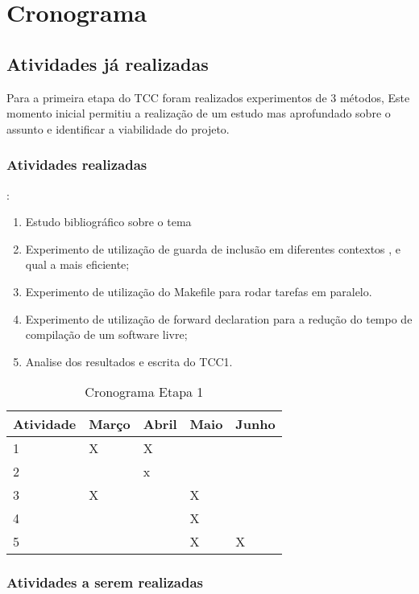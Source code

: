 \chapter[Cronograma]{Cronograma}

\section{Atividades já realizadas}

Para a primeira etapa do TCC foram realizados experimentos de 3 métodos,
 Este momento inicial permitiu a realização de um estudo mas aprofundado
 sobre o assunto e identificar a viabilidade do projeto.


\subsection{Atividades realizadas}:

\begin{enumerate}
	\item		Estudo bibliográfico sobre o tema
	\item		Experimento de utilização de guarda de inclusão em diferentes contextos , e qual a mais eficiente;
	\item		Experimento de utilização do Makefile para rodar tarefas em paralelo.
	\item		Experimento de utilização de forward declaration para a redução do tempo de compilação de um software livre;
	\item		Analise dos resultados e escrita do TCC1.
\end{enumerate}

\begin{table}[h]
\centering
\begin{tabular}{|l|l|l|l|l|}
Atividade & Março & Abril & Maio & Junho \\ \hline
1         & X     & X     &      &       \\ \hline
2         &       & x     &      &       \\  \hline
3         & X     &       & X    &       \\ \hline
4         &       &       & X    &       \\ \hline
5         &       &       & X   & X   \\   \hline
\end{tabular} 
\caption{Cronograma Etapa 1}
\label{cronograma1}
\end{table}


\subsection {Atividades a serem realizadas}

